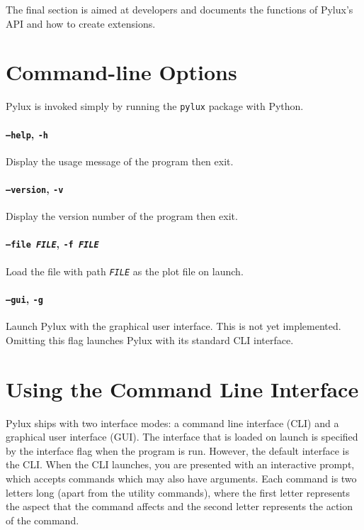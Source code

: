 \documentclass[a4paper]{article}
\begin{document}
The final section is aimed at developers and documents the functions of 
Pylux's API and how to create extensions.

\section{Command-line Options}
Pylux is invoked simply by running the \texttt{pylux} package with Python. 

\paragraph{\texttt{--help}, \texttt{-h}}
Display the usage message of the program then exit.

\paragraph{\texttt{--version}, \texttt{-v}}
Display the version number of the program then exit.

\paragraph{\texttt{--file \textit{FILE}}, \texttt{-f \textit{FILE}}} 
Load the file with path \texttt{\textit{FILE}} as the plot file on launch.

\paragraph{\texttt{--gui}, \texttt{-g}}
Launch Pylux with the graphical user interface. This is not yet implemented. 
Omitting this flag launches Pylux with its standard CLI interface.


\section{Using the Command Line Interface}
Pylux ships with two interface modes: a command line interface (CLI) and a 
graphical user interface (GUI). The interface that is loaded on launch is 
specified by the interface flag when the program is run. However, the 
default interface is the CLI. When the CLI launches, you are presented with an 
interactive prompt, which accepts commands which may also have arguments. Each 
command is two letters long (apart from the utility commands), where the first 
letter represents the aspect that the command affects and the second letter 
represents the action of the command.
\end{document}
